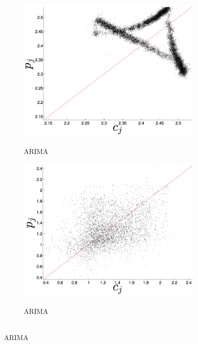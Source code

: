 \begin{figure}[htbp]
\begin{subfigure}{0.6\columnwidth}
  \end{subfigure}%
  \\
    \begin{subfigure}{0.6\columnwidth}
    \includegraphics[width=\columnwidth]{figs/colARIMAForecast.png}
    \caption{\col \\ ARIMA}
    \label{fig:colARIMA}
  \end{subfigure}
  \begin{subfigure}{0.6\columnwidth}
    \includegraphics[width=\columnwidth]{figs/gccARIMAForecast.png}
    \caption{\gcc \\ ARIMA }
    \label{fig:gccARIMA}
  \end{subfigure}%

\end{figure}
